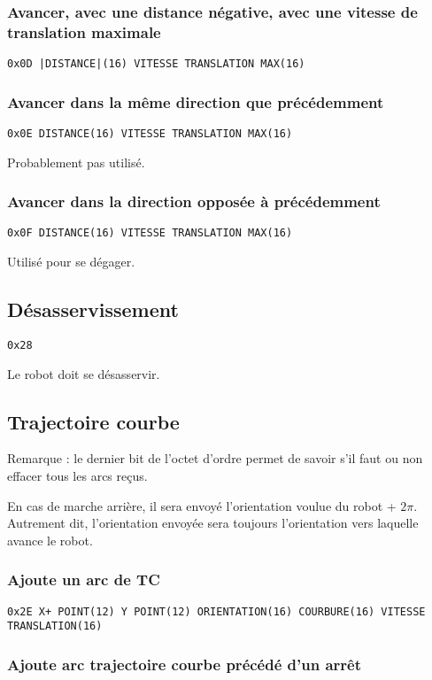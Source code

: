 \documentclass[a4paper, 12pt]{article}
\begin{document}
\subsubsection{Avancer, avec une distance négative, avec une vitesse de translation maximale}

    \texttt{0x0D |DISTANCE|(16) VITESSE  TRANSLATION  MAX(16)}
    
\subsubsection{Avancer dans la même direction que précédemment}

    \texttt{0x0E DISTANCE(16) VITESSE  TRANSLATION  MAX(16)}
    
Probablement pas utilisé.

\subsubsection{Avancer dans la direction opposée à précédemment}

    \texttt{0x0F DISTANCE(16) VITESSE  TRANSLATION  MAX(16)}

Utilisé pour se dégager.

\subsection{Désasservissement}
    \texttt{0x28}

Le robot doit se désasservir.

\subsection{Trajectoire courbe}

Remarque : le dernier bit de l'octet d'ordre permet de savoir s'il faut ou non effacer tous les arcs reçus.

En cas de marche arrière, il sera envoyé l'orientation voulue du robot + $2\pi$. Autrement dit, l'orientation envoyée sera toujours l'orientation vers laquelle avance le robot.

\subsubsection{Ajoute un arc de TC}

    \texttt{0x2E X+ POINT(12) Y POINT(12) ORIENTATION(16) COURBURE(16) VITESSE  TRANSLATION(16)}
    
\subsubsection{Ajoute arc trajectoire courbe précédé d'un arrêt}
\end{document}
